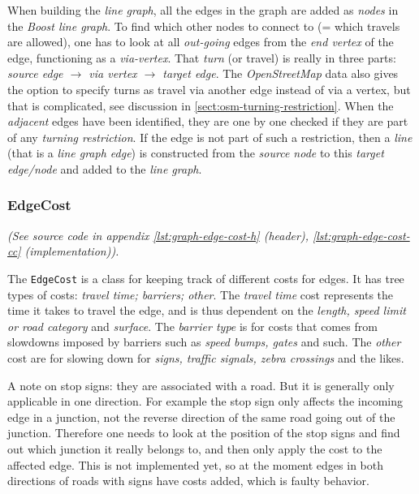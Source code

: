 \documentclass[../main.tex]{subfiles}
\begin{document}
When building the \textit{line graph}, all the edges in the graph are added as \textit{nodes} in the \textit{Boost line graph}. To find which other nodes to connect to (= which travels are allowed), one has to look at all \textit{out-going} edges from the \textit{end vertex} of the edge, functioning as a \textit{via-vertex}. That \textit{turn} (or travel) is really in three parts: \textit{source edge $\rightarrow$ via vertex $\rightarrow$ target edge}. The \textit{OpenStreetMap} data also gives the option to specify turns as travel via another edge instead of via a vertex, but that is complicated, see discussion in \ref{sect:osm-turning-restriction}. When the \textit{adjacent} edges have been identified, they are one by one checked if they are part of any \textit{turning restriction}. If the edge is not part of such a restriction, then a \textit{line} (that is a \textit{line graph edge}) is constructed from the \textit{source node} to this \textit{target edge/node} and added to the \textit{line graph}.

\subsubsection{EdgeCost}
\textit{(See source code in appendix \ref{lst:graph-edge-cost-h} (header), \ref{lst:graph-edge-cost-cc} (implementation)).}

\noindent
The \texttt{EdgeCost} is a class for keeping track of different costs for edges. It has tree types of costs: \textit{travel time; barriers; other}. The \textit{travel time} cost represents the time it takes to travel the edge, and is thus dependent on the \textit{length, speed limit or road category} and \textit{surface}. The \textit{barrier type} is for costs that comes from slowdowns imposed by barriers such as \textit{speed bumps, gates} and such. The \textit{other} cost are for slowing down for \textit{signs, traffic signals, zebra crossings} and the likes.

A note on stop signs: they are associated with a road. But it is generally only applicable in one direction. For example the stop sign only affects the incoming edge in a junction, not the reverse direction of the same road going out of the junction. Therefore one needs to look at the position of the stop signs and find out which junction it really belongs to, and then only apply the cost to the affected edge. This is not implemented yet, so at the moment edges in both directions of roads with signs have costs added, which is faulty behavior.
\end{document}
